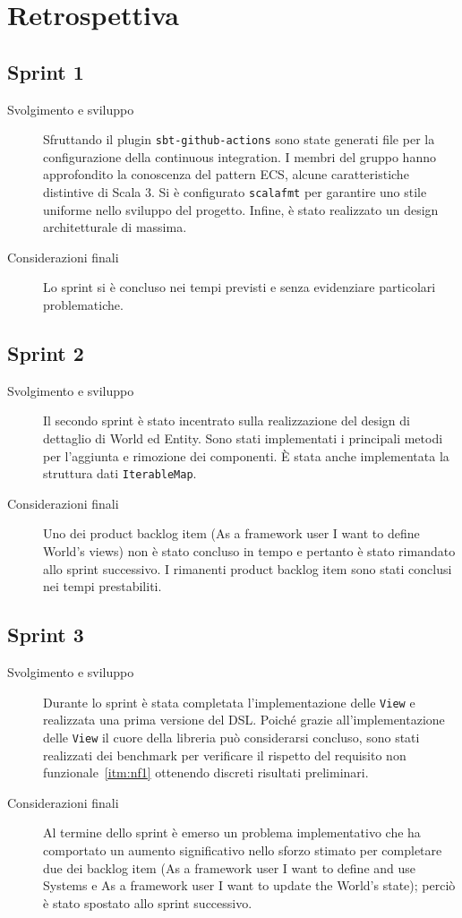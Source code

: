 \chapter{Retrospettiva}\label{ch:retrospettiva}
\section{Sprint 1}\label{sec:sprint-1}
\begin{description}
    \item [Svolgimento e sviluppo] Sfruttando il plugin \texttt{sbt-github-actions} sono state generati file per la configurazione della continuous integration.
    I membri del gruppo hanno approfondito la conoscenza del pattern ECS, alcune caratteristiche distintive di Scala 3.
    Si è configurato \texttt{scalafmt} per garantire uno stile uniforme nello sviluppo del progetto.
    Infine, è stato realizzato un design architetturale di massima.
    \item [Considerazioni finali] Lo sprint si è concluso nei tempi previsti e senza evidenziare particolari problematiche.
\end{description}
\section{Sprint 2}\label{sec:sprint-2}
\begin{description}
    \item[Svolgimento e sviluppo] Il secondo sprint è stato incentrato sulla realizzazione del design di dettaglio di World ed Entity.
    Sono stati implementati i principali metodi per l'aggiunta e rimozione dei componenti.
    È stata anche implementata la struttura dati \texttt{IterableMap}.
    \item[Considerazioni finali] Uno dei product backlog item (As a framework user I want to define World's views) non è stato concluso
    in tempo e pertanto è stato rimandato allo sprint successivo.
    I rimanenti product backlog item sono stati conclusi nei tempi prestabiliti.
\end{description}
\section{Sprint 3}\label{sec:sprint-3}
\begin{description}
    \item[Svolgimento e sviluppo] Durante lo sprint è stata completata l'implementazione delle \texttt{View} e realizzata una prima versione del DSL\@.
    Poiché grazie all'implementazione delle \texttt{View} il cuore della libreria può considerarsi concluso, sono stati realizzati dei benchmark
    per verificare il rispetto del requisito non funzionale~\ref{itm:nf1} ottenendo discreti risultati preliminari.
    \item[Considerazioni finali] Al termine dello sprint è emerso un problema implementativo che ha comportato un aumento significativo nello sforzo
    stimato per completare due dei backlog item (As a framework user I want to define and use Systems e As a framework user I want to update the World's state);
    perciò è stato spostato allo sprint successivo.
\end{description}
